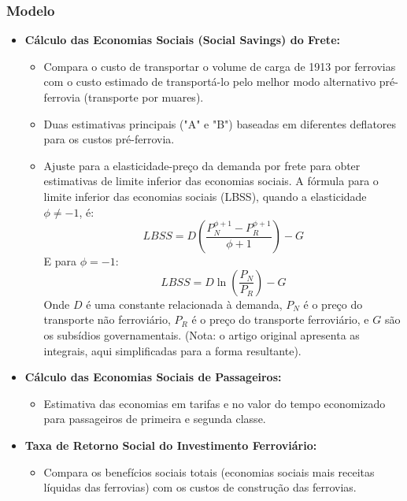 \documentclass[12pt]{article}
\begin{document}
\subsubsection*{Modelo}
\begin{itemize}
    \item \textbf{Cálculo das Economias Sociais (Social Savings) do Frete:}
    \begin{itemize}
        \item Compara o custo de transportar o volume de carga de 1913 por ferrovias com o custo estimado de transportá-lo pelo melhor modo alternativo pré-ferrovia (transporte por muares).
        \item Duas estimativas principais ("A" e "B") baseadas em diferentes deflatores para os custos pré-ferrovia.
        \item Ajuste para a elasticidade-preço da demanda por frete para obter estimativas de limite inferior das economias sociais. A fórmula para o limite inferior das economias sociais (LBSS), quando a elasticidade $\phi \neq -1$, é:
        \begin{equation} \label{eq:summerhill_lbss1}
            LBSS = D \left( \frac{P_N^{\phi+1} - P_R^{\phi+1}}{\phi+1} \right) - G
        \end{equation}
        E para $\phi = -1$:
        \begin{equation} \label{eq:summerhill_lbss2}
            LBSS = D \ln\left(\frac{P_N}{P_R}\right) - G
        \end{equation}
        Onde $D$ é uma constante relacionada à demanda, $P_N$ é o preço do transporte não ferroviário, $P_R$ é o preço do transporte ferroviário, e $G$ são os subsídios governamentais. (Nota: o artigo original apresenta as integrais, aqui simplificadas para a forma resultante).
    \end{itemize}
    \item \textbf{Cálculo das Economias Sociais de Passageiros:}
    \begin{itemize}
        \item Estimativa das economias em tarifas e no valor do tempo economizado para passageiros de primeira e segunda classe.
    \end{itemize}
    \item \textbf{Taxa de Retorno Social do Investimento Ferroviário:}
    \begin{itemize}
        \item Compara os benefícios sociais totais (economias sociais mais receitas líquidas das ferrovias) com os custos de construção das ferrovias.

\end{itemize}
\end{itemize}
\end{document}
